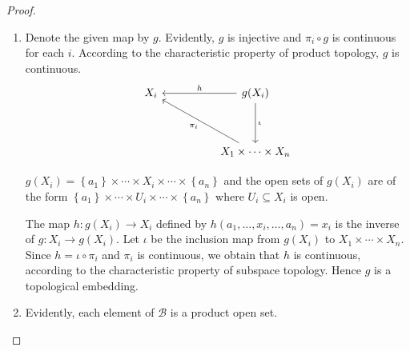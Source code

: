 \begin{proof}
\begin{enumerate}[itemsep=0pt,label={(\alph*)}]
              \( \pi_{i} \circ \iota \circ f^{-1} = \iota_{S_{i}} \circ \tau_{i} \) is continuous, from which it follows that \( \iota \circ f^{-1} \) is continuous, according to the characteristic property of product topology. According to the characteristic property of subspace topology, \( f^{-1} \) is continuous.

              \( \iota_{S_{i}} \circ \tau_{i} \circ f = \pi_{i} \circ \iota \) is continuous, so \( \tau_{i} \circ f \) is continuous, according to the characteristic property of subspace topology. According to the characteristic property of product topology, \( f \) is continuous.

              Hence \( f \) is a homeomorphism, which means \( A \) and \( B \) are identical.
        \item Denote the given map by \( g \). Evidently, \( g \) is injective and \( \pi_{i} \circ g \) is continuous for each \( i \). According to the characteristic property of product topology, \( g \) is continuous.
              \[
                  \begin{tikzcd}
                      {X_{i}} && {g(X_{i})} \\
                      \\
                      && {X_{1} \times \cdots \times X_{n}}
                      \arrow["h"', from=1-3, to=1-1]
                      \arrow["\iota", from=1-3, to=3-3]
                      \arrow["{\pi_{i}}", from=3-3, to=1-1]
                  \end{tikzcd}
              \]

              \( g(X_{i}) = \left\{ a_{1} \right\} \times \cdots \times X_{i} \times \cdots \times \left\{ a_{n} \right\} \) and the open sets of \( g(X_{i}) \) are of the form \( \left\{ a_{1} \right\} \times \cdots \times U_{i} \times \cdots \times \left\{ a_{n} \right\} \) where \( U_{i} \subseteq X_{i} \) is open.

              The map \( h: g(X_{i}) \to X_{i} \) defined by \( h(a_{1}, \ldots, x_{i}, \ldots, a_{n}) = x_{i} \) is the inverse of \( g: X_{i} \to g(X_{i}) \). Let \( \iota \) be the inclusion map from \( g(X_{i}) \) to \( X_{1} \times \cdots \times X_{n} \). Since \( h = \iota \circ \pi_{i} \) and \( \pi_{i} \) is continuous, we obtain that \( h \) is continuous, according to the characteristic property of subspace topology. Hence \( g \) is a topological embedding.
        \item Evidently, each element of \( \mathcal{B} \) is a product open set.


\end{enumerate}
\end{proof}
